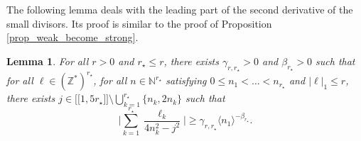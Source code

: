 \documentclass[11pt]{article}
\newcommand{\llbracket}{\mathopen{[\!\![}}
\newcommand{\rrbracket}{\mathclose{]\!\!]}}
\newtheorem{lemma}[theorem]{Lemma}
\theoremstyle{definition}
\begin{document}
The following lemma deals with the leading part of the second derivative of the small divisors. Its proof is similar to the proof of Proposition \ref{prop_weak_become_strong}.
\begin{lemma}\label{lem_SD_frac}
For all $r>0$ and $r_\star \leq r$, there exists $\gamma_{r,r_\star}>0$ and $\beta_{r_\star}>0$ such that for all $\ell \in (\mathbb{Z}^*)^{r_\star}$, for all $n \in \mathbb{N}^{r_\star}$ satisfying $0\leq n_1 < \dots < n_{r_\star}$ and $|\ell|_1 \leq r$, there exists $j\in \llbracket 1,5r_\star \rrbracket \setminus \bigcup_{k=1}^{r_\star}\{ n_k,2n_k\}$ such that
\begin{equation}
\label{eq_SD_rat}
\biggl| \sum_{k=1}^{r_\star} \frac{\ell_k}{4n_k^2-j^2} \biggr| \geq \gamma_{r,r_\star} \langle n_1 \rangle^{-\beta_{r_\star}}.
\end{equation}
\end{lemma}
\end{document}
